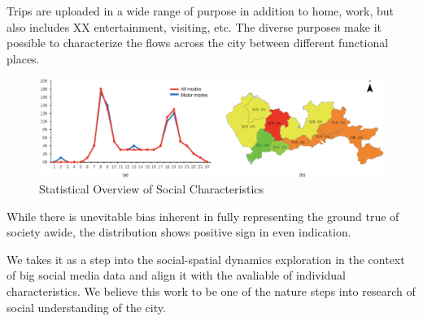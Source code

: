 Trips are uploaded in a wide range of purpose in addition to home, work, but also includes XX entertainment, visiting, etc. The diverse purposes make it possible to characterize the flows across the city between different functional places. 

\begin{figure}[htb!]
 \centering %
 \includegraphics[width=\columnwidth]{pictures/data3}
 \caption{Statistical Overview of Social Characteristics}
 \label{fig:data_geometry}
\end{figure}

While there is unevitable bias inherent in fully representing the ground true of society awide, the distribution shows positive sign in even indication. 

We takes it as a step into the social-spatial dynamics exploration in the context of big social media data and align it with the avaliable of individual characteristics. We believe this work to be one of the nature steps into research of social understanding of the city.
